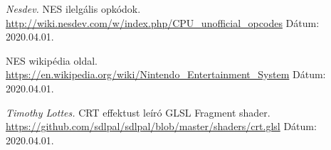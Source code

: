 \documentclass[
]{elteikthesis}[2020/02/26]
\begin{document}
\begin{thebibliography}{9}
	\textit{Nesdev.}
	NES ilelgális opkódok.
	\newline
	\url{http://wiki.nesdev.com/w/index.php/CPU_unofficial_opcodes}
	\newline Dátum: 2020.04.01.
	
	NES wikipédia oldal.
	\newline
	\url{https://en.wikipedia.org/wiki/Nintendo_Entertainment_System}
	\newline Dátum: 2020.04.01.
	
	\textit{Timothy Lottes.}
	CRT effektust leíró GLSL Fragment shader.
	\newline
	\url{https://github.com/sdlpal/sdlpal/blob/master/shaders/crt.glsl}
	\newline Dátum: 2020.04.01.
\end{thebibliography}
\cleardoublepage

\listoffigures
\cleardoublepage

\listoftables
\cleardoublepage



\printnomenclature
\end{document}
